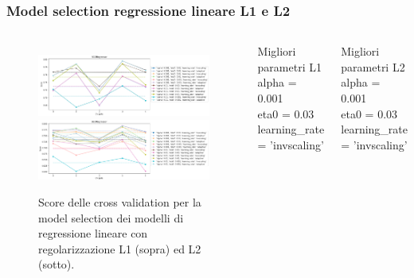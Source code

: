 \documentclass{beamer}
\begin{document}
\begin{frame}
	\frametitle{Model selection regressione lineare L1 e L2}
	\begin{columns}
		\begin{figure}[ht]
			\centering
			\includegraphics[width=\textwidth]{lassocv.png}
			\includegraphics[width=\textwidth]{ridgecv.png}
			\caption{Score delle cross validation per la model selection dei modelli
			di regressione lineare con regolarizzazione L1 (sopra) ed L2 (sotto).}
		\end{figure}
		\begin{alertblock}{Migliori parametri L1}
			alpha = 0.001\\
			eta0 = 0.03\\
			learning\_rate = 'invscaling'
		\end{alertblock}
		\begin{alertblock}{Migliori parametri L2}
			alpha = 0.001\\
			eta0 = 0.03\\
			learning\_rate = 'invscaling'
		\end{alertblock}
	\end{columns}
\end{frame}
\end{document}
